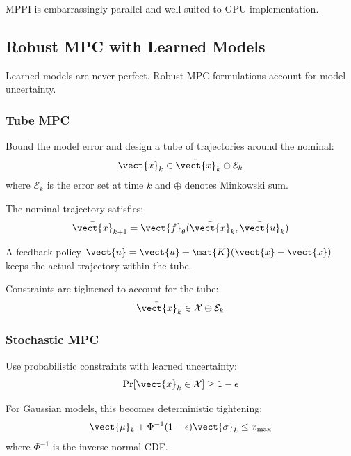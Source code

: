 MPPI is embarrassingly parallel and well-suited to GPU implementation.

\subsection{Robust MPC with Learned Models}

Learned models are never perfect. Robust MPC formulations account for model uncertainty.

\subsubsection{Tube MPC}

Bound the model error and design a tube of trajectories around the nominal:
\begin{equation}
\vect{x}_k \in \bar{\vect{x}}_k \oplus \mathcal{E}_k
\label{eq:tube_mpc}
\end{equation}
where $\mathcal{E}_k$ is the error set at time $k$ and $\oplus$ denotes Minkowski sum.

The nominal trajectory satisfies:
\begin{equation}
\bar{\vect{x}}_{k+1} = \vect{f}_\theta(\bar{\vect{x}}_k, \bar{\vect{u}}_k)
\end{equation}

A feedback policy $\vect{u} = \bar{\vect{u}} + \mat{K}(\vect{x} - \bar{\vect{x}})$ keeps the actual trajectory within the tube.

Constraints are tightened to account for the tube:
\begin{equation}
\bar{\vect{x}}_k \in \mathcal{X} \ominus \mathcal{E}_k
\end{equation}

\subsubsection{Stochastic MPC}

Use probabilistic constraints with learned uncertainty:
\begin{equation}
\Pr[\vect{x}_k \in \mathcal{X}] \geq 1 - \epsilon
\label{eq:chance_constraint}
\end{equation}

For Gaussian models, this becomes deterministic tightening:
\begin{equation}
\vect{\mu}_k + \Phi^{-1}(1-\epsilon) \vect{\sigma}_k \leq x_{\max}
\end{equation}
where $\Phi^{-1}$ is the inverse normal CDF.

